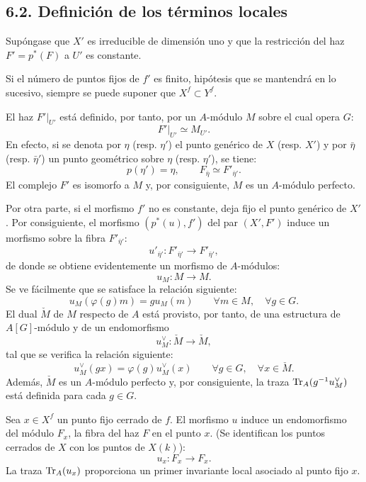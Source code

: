 \subsection*{6.2. Definición de los términos locales}
Supóngase que $X'$ es irreducible de dimensión uno y que la restricción del haz $F'=p^*(F)$ a $U'$ es constante.

Si el número de puntos fijos de $f'$ es finito, hipótesis que se mantendrá en lo sucesivo, siempre se puede suponer que $X^f \subset Y^f$.

El haz $F'|_{U'}$ está definido, por tanto, por un $A$-módulo $M$ sobre el cual opera $G$:
\[
F'|_{U'} \simeq M_{U'} .
\]
En efecto, si se denota por $\eta$ (resp. $\eta'$) el punto genérico de $X$ (resp. $X'$) y por $\bar\eta$ (resp. $\bar\eta'$) un punto geométrico sobre $\eta$ (resp. $\eta'$), se tiene:
\[
p(\eta')=\eta,\qquad F_{\bar\eta} \simeq F'_{\bar\eta'} .
\]
El complejo $F'$ es isomorfo a $M$ y, por consiguiente, $M$ es un $A$-módulo perfecto.

Por otra parte, si el morfismo $f'$ no es constante, deja fijo el punto genérico de $X'$. Por consiguiente, el morfismo $(p^*(u),f')$ del par $(X',F')$ induce un morfismo sobre la fibra $F'_{\bar\eta'}$:
\[
u'_{\bar\eta'}:F'_{\bar\eta'}\longrightarrow F'_{\bar\eta'} ,
\]
de donde se obtiene evidentemente un morfismo de $A$-módulos:
\[
u_M:M\longrightarrow M .
\]
Se ve fácilmente que se satisface la relación siguiente:
\begin{equation}\tag{6.2.1}
u_M(\varphi(g)m)=g u_M(m) \qquad \forall m\in M,\quad \forall g\in G .
\end{equation}
El dual $\check{M}$ de $M$ respecto de $A$ está provisto, por tanto, de una estructura de $A[G]$-módulo y de un endomorfismo
\[
u_M^\vee:\check{M}\longrightarrow \check{M} ,
\]
tal que se verifica la relación siguiente:
\[
u_M^\vee(gx)=\varphi(g)u_M^\vee(x) \qquad \forall g\in G,\quad \forall x\in \check{M} .
\]
Además, $\check{M}$ es un $A$-módulo perfecto y, por consiguiente, la traza $\operatorname{Tr}_A(g^{-1}u_M^\vee)$ está definida para cada $g\in G$.

Sea $x\in X^f$ un punto fijo cerrado de $f$. El morfismo $u$ induce un endomorfismo del módulo $F_x$, la fibra del haz $F$ en el punto $x$. (Se identifican los puntos cerrados de $X$ con los puntos de $X(k)$):
\[
u_x:F_x\longrightarrow F_x .
\]
La traza $\operatorname{Tr}_A(u_x)$ proporciona un primer invariante local asociado al punto fijo $x$.

